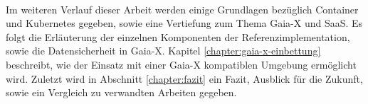 \paragraph{}
Im weiteren Verlauf dieser Arbeit werden einige Grundlagen bezüglich Container und Kubernetes gegeben,
sowie eine Vertiefung zum Thema Gaia-X und \acf{SaaS}.
Es folgt die Erläuterung der einzelnen Komponenten der Referenzimplementation, sowie die Datensicherheit in Gaia-X.
Kapitel \ref{chapter:gaia-x-einbettung} beschreibt, wie der Einsatz mit einer Gaia-X kompatiblen Umgebung ermöglicht wird.
Zuletzt wird in Abschnitt \ref{chapter:fazit} ein Fazit, Ausblick für die Zukunft, sowie ein Vergleich zu verwandten Arbeiten gegeben.
